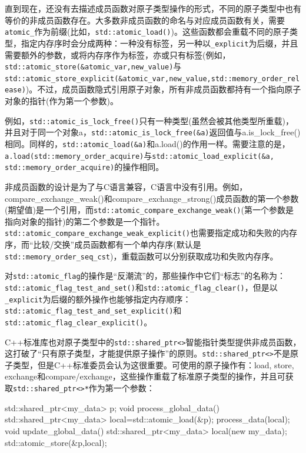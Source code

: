 
直到现在，还没有去描述成员函数对原子类型操作的形式，不同的原子类型中也有等价的非成员函数存在。大多数非成员函数的命名与对应成员函数有关，需要\texttt{atomic\_}作为前缀(比如，\texttt{std::atomic\_load()})。这些函数都会重载不同的原子类型，指定内存序时会分成两种：一种没有标签，另一种以\texttt{\_explicit}为后缀，并且需要额外的参数，或将内存序作为标签，亦或只有标签(例如，\texttt{std::atomic\_store(\&atomic\_var,new\_value)}与\texttt{std::atomic\_store\_explicit(\&atomic\_var,new\_value,std::memory\_order\_release)})。不过，成员函数隐式引用原子对象，所有非成员函数都持有一个指向原子对象的指针(作为第一个参数)。

例如，\texttt{std::atomic\_is\_lock\_free()}只有一种类型(虽然会被其他类型所重载)，并且对于同一个对象a，\texttt{std::atomic\_is\_lock\_free(\&a)}返回值与a.is\_lock\_free()相同。同样的，\texttt{std::atomic\_load(\&a)}和a.load()的作用一样。需要注意的是，\texttt{a.load(std::memory\_order\_acquire)}与\texttt{std::atomic\_load\_explicit(\&a, std::memory\_order\_acquire)}的操作相同。

非成员函数的设计是为了与C语言兼容，C语言中没有引用。例如，compare\_exchange\_weak()和compare\_exchange\_strong()成员函数的第一个参数(期望值)是一个引用，而\texttt{std::atomic\_compare\_exchange\_weak()}(第一个参数是指向对象的指针)的第二个参数是一个指针。\texttt{std::atomic\_compare\_exchange\_weak\_explicit()}也需要指定成功和失败的内存序，而“比较/交换”成员函数都有一个单内存序(默认是\texttt{std::memory\_order\_seq\_cst})，重载函数可以分别获取成功和失败内存序。

对\texttt{std::atomic\_flag}的操作是“反潮流”的，那些操作中它们“标志”的名称为：\texttt{std::atomic\_flag\_test\_and\_set()}和\texttt{std::atomic\_flag\_clear()}，但是以\texttt{\_explicit}为后缀的额外操作也能够指定内存顺序：\texttt{std::atomic\_flag\_test\_and\_set\_explicit()}和\texttt{std::atomic\_flag\_clear\_explicit()}。

C++标准库也对原子类型中的\texttt{std::shared\_ptr<>}智能指针类型提供非成员函数，这打破了“只有原子类型，才能提供原子操作”的原则。\texttt{std::shared\_ptr<>}不是原子类型，但是C++标准委员会认为这很重要。可使用的原子操作有：load, store, exchange和compare/exchange，这些操作重载了标准原子类型的操作，并且可获取\texttt{std::shared\_ptr<>*}作为第一个参数：

\begin{cpp}
std::shared_ptr<my_data> p;
void process_global_data()
{
  std::shared_ptr<my_data> local=std::atomic_load(&p);
  process_data(local);
}
void update_global_data()
{
  std::shared_ptr<my_data> local(new my_data);
  std::atomic_store(&p,local);
}
\end{cpp}

